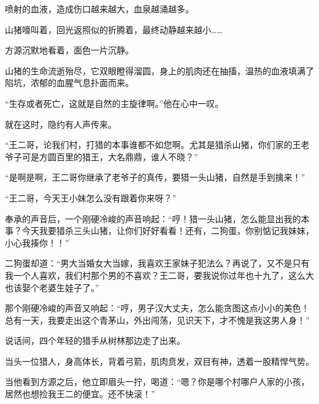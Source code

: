 \begin{this_body}
喷射的血液，造成伤口越来越大，血泉越涌越多。

山猪嚎叫着，回光返照似的折腾着，最终动静越来越小……

方源沉默地看着，面色一片沉静。

山猪的生命流逝殆尽，它双眼瞪得溜圆，身上的肌肉还在抽搐，温热的血液填满了陷坑，浓郁的血腥气息扑面而来。

“生存或者死亡，这就是自然的主旋律啊。”他在心中一叹。

就在这时，隐约有人声传来。

“王二哥，论我们村，打猎的本事谁都不如您啊。尤其是猎杀山猪，你们家的王老爷子可是方圆百里的猎王，大名鼎鼎，谁人不晓？”

“是啊是啊，王二哥你继承了老爷子的真传，要猎一头山猪，自然是手到擒来！”

“王二哥，今天王小妹怎么没有跟着你来呀？”

奉承的声音后，一个刚硬冷峻的声音响起：“哼！猎一头山猪，怎么能显出我的本事？今天我要猎杀三头山猪，让你们好好看看！还有，二狗蛋，你别惦记我妹妹，小心我揍你！！”

二狗蛋却道：“男大当婚女大当嫁，我喜欢王家妹子犯法么？再说了，又不是只有我一个人喜欢，我们村那个男的不喜欢？王二哥，要我说你过年也十九了，这么大也该娶个老婆生娃子了。”

那个刚硬冷峻的声音又响起：“哼，男子汉大丈夫，怎么能贪图这点小小的美色！总有一天，我要走出这个青茅山，外出闯荡，见识天下，才不愧是我这男人身！”

说话间，四个年轻的猎手从树林那边走了出来。

当头一位猎人，身高体长，背着弓箭，肌肉贲发，双目有神，透着一股精悍气势。

当他看到方源之后，他立即眉头一拧，喝道：“嗯？你是哪个村哪户人家的小孩，居然也想捡我王二的便宜。还不快滚！”

\end{this_body}

